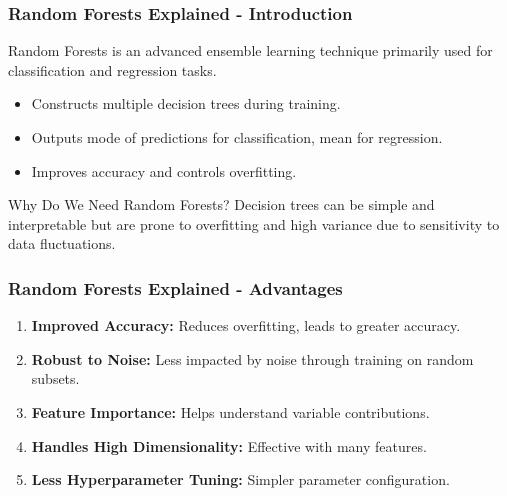 \documentclass[aspectratio=169]{beamer}
\begin{document}
\begin{frame}[fragile]
    \frametitle{Random Forests Explained - Introduction}
    Random Forests is an advanced ensemble learning technique primarily used for classification and regression tasks. 
    \begin{itemize}
        \item Constructs multiple decision trees during training.
        \item Outputs mode of predictions for classification, mean for regression.
        \item Improves accuracy and controls overfitting.
    \end{itemize}
    \begin{block}{Why Do We Need Random Forests?}
        Decision trees can be simple and interpretable but are prone to overfitting and high variance due to sensitivity to data fluctuations.
    \end{block}
\end{frame}

\begin{frame}[fragile]
    \frametitle{Random Forests Explained - Advantages}
    \begin{enumerate}
        \item \textbf{Improved Accuracy:} Reduces overfitting, leads to greater accuracy.
        \item \textbf{Robust to Noise:} Less impacted by noise through training on random subsets.
        \item \textbf{Feature Importance:} Helps understand variable contributions.
        \item \textbf{Handles High Dimensionality:} Effective with many features.
        \item \textbf{Less Hyperparameter Tuning:} Simpler parameter configuration.
    \end{enumerate}
\end{frame}
\end{document}
